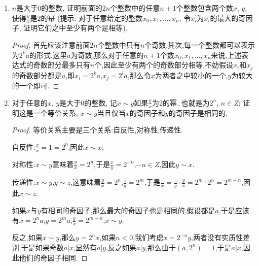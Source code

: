 \documentclass[12pt,a4paper]{book} %
\theoremstyle{remark}
\theoremstyle{example}
\theoremstyle{lemma}
\theoremstyle{corollary}
\numberwithin{theorem}{chapter}
\begin{document}
\begin{enumerate}
\begin{proof}
反之,如果$a \equiv b \mod{d}$,那么$d|(a-b)$,$a-b=kd$.另一方面,$d=(m,n)$,那么存在$u$,$v$使得$d=mu+nv$,于是$kmu+knv=a-b$,令$x=-kmu+a=knv+b$.显然$x$满足同余组.也就是同余组有解.

如果$d=1$,设$x_1$和$x_2$都是同余组的任意两个解,我们需要证明$x_1 \equiv x_2 \mod{mn}$.只要注意到此时有$x_1 \equiv x_2 \mod{m}$和$x_1 \equiv x_2 \mod{n}$.当$d=1$时,有$x_1 \equiv x_2 \mod{mn}$.它只是前面出现过的一个习题的另一种表示方式:如果$(m,n)=1$,$m|c$,$n|c$,必有$mn|c$.这里的$c=x_1-x_2$.
\end{proof}

\item $n$是大于0的整数, 证明前面的$2n$个整数中的任意$n + 1$个整数包含两个数$x$, $y$, 使得$\frac{y}{x}$是2的幂 (提示: 对于任意给定的整数$x_0, x_1, \ldots, x_n$, 令$x_{i}^{'}$为$x_i$的最大的奇因子, 证明它们之中至少有两个是相等).

\begin{proof}
首先应该注意前面$2n$个整数中只有$n$个奇数,其次,每一个整数都可以表示为$2^ka$的形式,这里$a$为奇数,那么对于任意的$n+1$个数$x_0, x_1, \ldots, x_n$来说,上述表达式的奇数部分最多只有$n$个,因此至少有两个的奇数部分相等,不妨假设$x_i$和$x_j$的奇数部分都是$a$,即$x_i=2^ka$,$x_j=2^la$,那么令$x$为两者之中较小的一个,$y$为较大的一个即可.
\end{proof}

\item 对于任意的$x$, $y$是大于0的整数, 记$x \sim y$如果$\frac{y}{x}$为2的幂, 也就是为$2^n$, $n \in Z$; 证明这是一个等价关系, $x \sim y$当且仅当$x$的奇因子和$y$的奇因子是相同的.

\begin{proof}
等价关系主要是三个关系:自反性,对称性,传递性.

自反性:$\frac{x}{x} = 1 = 2^0$,因此$x \sim x$;

对称性:$x \sim y$意味着$\frac{y}{x} = 2^n$,于是$\frac{x}{y}=2^{-n}$,$-n \in Z$,因此$y \sim x$.

传递性:$x \sim y$,$y \sim z$,这意味着$\frac{y}{x}=2^n$,$\frac{z}{y}=2^m$,于是$\frac{z}{x} = \frac{z}{y}\cdot\frac{y}{x}=2^m\cdot2^n=2^{m+n}$,因此$x \sim z$.

如果$x$与$y$有相同的奇因子,那么最大的奇因子也是相同的,假设都是$a$,于是应该有$x=2^na$,$y=2^ma$,$\frac{y}{x}=2^{m-n}$,$x \sim y$.

反之,如果$x \sim y$,那么$y = 2^nx$,如果$n < 0$,我们考虑$x = 2^{-n}y$,两者没有实质性差别.于是如果奇数$a|x$,显然有$a|y$,反之如果$a|y$,那么由于$(a,2^n)=1$,于是$a|x$,因此他们的奇因子相同.
\end{proof}

\end{enumerate}
\end{document}
